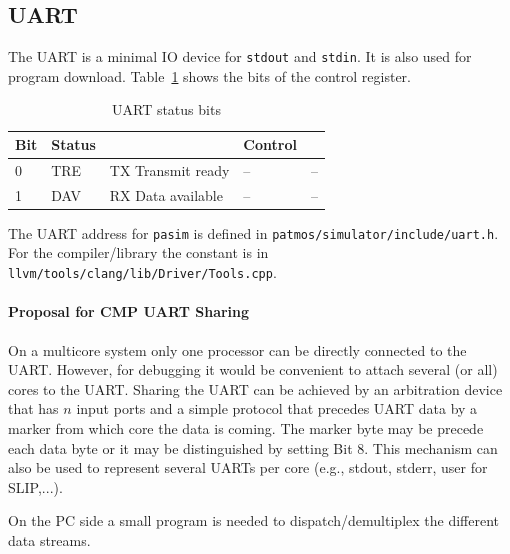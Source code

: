 \documentclass[a4paper,fontsize=10pt,twoside,DIV15,BCOR12mm,headinclude=true,footinclude=false,pagesize,bibtotoc]{scrbook}
\newcommand{\code}[1]{{\texttt{#1}}}
\newcommand{\comment}[3]{

\textsf{\textbf{#1}} {\color{#3}#2}}
\newcommand{\martin}[1]{\comment{Martin}{#1}{Blue}}
\newcommand{\stefan}[1]{\comment{Stefan}{#1}{RoyalPurple}}
\renewcommand{\martin}[1]{}
\renewcommand{\stefan}[1]{}
\begin{document}
\subsection{UART}

The UART is a minimal IO device for \texttt{stdout} and \texttt{stdin}.
It is also used for program download. Table~\ref{tab:uart} shows the
bits of the control register.

\begin{table}
\centering
\begin{tabular}{lllll}
\toprule
Bit & Status & & Control & \\
\midrule
0 & TRE & TX Transmit ready & -- & -- \\
1 & DAV & RX Data available & -- & -- \\
\bottomrule
\end{tabular}
\caption{UART status bits} %
\label{tab:uart}
\end{table}

The UART address for \code{pasim} is defined in \code{patmos/simulator/include/uart.h}.
For the compiler/library the constant is in \code{llvm/tools/clang/lib/Driver/Tools.cpp}.

\paragraph{Proposal for CMP UART Sharing}
On a multicore system only one processor can be directly connected to the
UART. However, for debugging it would be convenient to attach several (or all)
cores to the UART. Sharing the UART can be achieved by an arbitration device
that has $n$ input ports and a simple protocol that precedes UART data by a
marker from which core the data is coming. The marker byte may be precede
each data byte or it may be distinguished by setting Bit 8. This mechanism can
also be used to represent several UARTs per core (e.g., stdout, stderr, user for SLIP,...).
\martin{The protocol shall be done in HW -- let's find a student for this.}

On the PC side a small program is needed to dispatch/demultiplex the different
data streams.

\stefan{Would be nice to be able to insert control bytes to flush the output as well, but that must be understood by the simulator as well (it
must flush its output stream).

With multiple cores writing to the UART, we need to prevent mixing up control bytes and data bytes from different cores, so I assume adding
the control bytes to is done by hardware? We could also designate one core to I/O and communicate over SPMs with the other cores, although it
adds another layer of potential bugs to the debugging process.}
\end{document}

